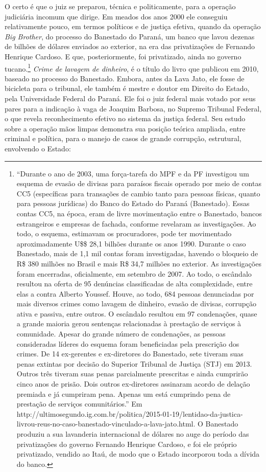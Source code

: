 O certo é que o juiz se preparou, técnica e politicamente, para a
operação judiciária incomum que dirige. Em meados dos anos 2000 ele
conseguiu relativamente pouco, em termos políticos e de justiça efetiva,
quando da operação \emph{Big Brother}, do processo do Banestado do
Paraná, um banco que lavou dezenas de bilhões de dólares enviados ao
exterior, na era das privatizações de Fernando Henrique Cardoso. E que,
posteriormente, foi privatizado, ainda no governo tucano.\footnote{``Durante
  o ano de 2003, uma força-tarefa do MPF e da PF investigou um esquema
  de evasão de divisas para paraísos fiscais operado por meio de contas
  CC5 (específicas para transações de cambio tanto para pessoas físicas,
  quanto para pessoas jurídicas) do Banco do Estado do Paraná
  (Banestado). Essas contas CC5, na época, eram de livre movimentação
  entre o Banestado, bancos estrangeiros e empresas de fachada, conforme
  revelaram as investigações. Ao todo, o esquema, estimavam os
  procuradores, pode ter movimentado aproximadamente U\$\$ 28,1 bilhões
  durante os anos 1990. Durante o caso Banestado, mais de 1,1 mil contas
  foram investigadas, havendo o bloqueio de R\$ 380 milhões no Brasil e
  mais R\$ 34,7 milhões no exterior. As investigações foram encerradas,
  oficialmente, em setembro de 2007. Ao todo, o escândalo resultou na
  oferta de 95 denúncias classificadas de alta complexidade, entre elas
  a contra Alberto Youssef. Houve, ao todo, 684 pessoas denunciadas por
  mais diversos crimes como lavagem de dinheiro, evasão de divisas,
  corrupção ativa e passiva, entre outros. O escândalo resultou em 97
  condenações, quase a grande maioria gerou sentenças relacionadas à
  prestação de serviços à comunidade. Apesar do grande número de
  condenações, as pessoas consideradas líderes do esquema foram
  beneficiadas pela prescrição dos crimes. De 14 ex-gerentes e
  ex-diretores do Banestado, sete tiveram suas penas extintas por
  decisão do Superior Tribunal de Justiça (STJ) em 2013. Outros três
  tiveram suas penas parcialmente prescritas e ainda cumprirão cinco
  anos de prisão. Dois outros ex-diretores assinaram acordo de delação
  premiada e já cumpriram pena. Apenas um está cumprindo pena de
  prestação de serviços comunitários.'' Em
  http://ultimosegundo.ig.com.br/politica/2015-01-19/lentidao-da-justica-livrou-reus-no-caso-banestado-vinculado-a-lava-jato.html.
  O Banestado produziu a sua lavanderia internacional de dólares no auge
  do período das privatizações do governo Fernando Henrique Cardoso, e
  foi ele próprio privatizado, vendido ao Itaú, de modo que o Estado
  incorporou toda a dívida do banco.} \emph{Crime de lavagem de
dinheiro}, é o título do livro que publicou em 2010, baseado no processo
do Banestado. Embora, antes da Lava Jato, ele fosse de bicicleta para o
tribunal, ele também é mestre e doutor em Direito do Estado, pela
Universidade Federal do Paraná. Ele foi o juiz federal mais votado por
seus pares para a indicação à vaga de Joaquim Barbosa, no Supremo
Tribunal Federal, o que revela reconhecimento efetivo no sistema da
justiça federal. Seu estudo sobre a operação mãos limpas demonstra sua
posição teórica ampliada, entre criminal e política, para o manejo de
casos de grande corrupção, estrutural, envolvendo o Estado:

